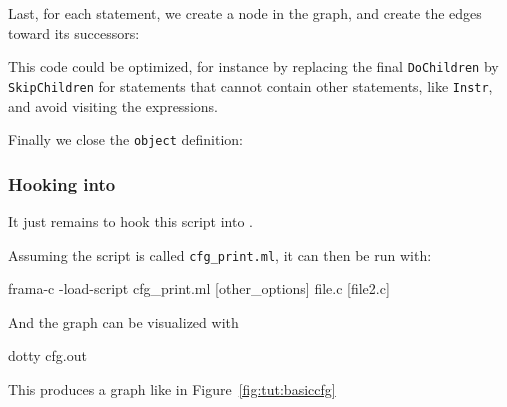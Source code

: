 Last, for each statement, we create a node in the graph, and create
the edges toward its successors:


This code could be optimized, for instance by replacing the final
\texttt{DoChildren} by \texttt{SkipChildren} for statements that
cannot contain other statements, like \texttt{Instr}, and avoid
visiting the expressions.

Finally we close the \texttt{object} definition:

\subsubsection*{Hooking into \framac}

It just remains to hook this script into \framac.


Assuming the script is called \texttt{cfg\_print.ml}, it can then be run with:
\begin{shell}
  frama-c -load-script cfg_print.ml [other_options] file.c [file2.c] 
\end{shell}

And the graph can be visualized with 
\begin{shell}
  dotty cfg.out
\end{shell}

This produces a graph like in Figure~\ref{fig:tut:basiccfg}

